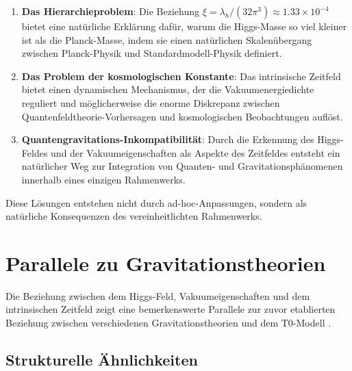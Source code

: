 \documentclass[12pt,a4paper]{article}
\begin{document}
	\begin{enumerate}
		\item \textbf{Das Hierarchieproblem}: Die Beziehung $\xi = \lambda_h/(32\pi^3) \approx 1.33 \times 10^{-4}$ bietet eine natürliche Erklärung dafür, warum die Higgs-Masse so viel kleiner ist als die Planck-Masse, indem sie einen natürlichen Skalenübergang zwischen Planck-Physik und Standardmodell-Physik definiert.
		
		\item \textbf{Das Problem der kosmologischen Konstante}: Das intrinsische Zeitfeld bietet einen dynamischen Mechanismus, der die Vakuumenergiedichte reguliert und möglicherweise die enorme Diskrepanz zwischen Quantenfeldtheorie-Vorhersagen und kosmologischen Beobachtungen auflöst.
		
		\item \textbf{Quantengravitations-Inkompatibilität}: Durch die Erkennung des Higgs-Feldes und der Vakuumeigenschaften als Aspekte des Zeitfeldes entsteht ein natürlicher Weg zur Integration von Quanten- und Gravitationsphänomenen innerhalb eines einzigen Rahmenwerks.
	\end{enumerate}
	
	Diese Lösungen entstehen nicht durch ad-hoc-Anpassungen, sondern als natürliche Konsequenzen des vereinheitlichten Rahmenwerks.
	
	\section{Parallele zu Gravitationstheorien}
	\label{sec:parallel_gravitation}
	
	Die Beziehung zwischen dem Higgs-Feld, Vakuumeigenschaften und dem intrinsischen Zeitfeld zeigt eine bemerkenswerte Parallele zur zuvor etablierten Beziehung zwischen verschiedenen Gravitationstheorien und dem T0-Modell \cite{pascher_completetheory_2025}.
	
	\subsection{Strukturelle Ähnlichkeiten}
	\label{subsec:structural_similarities}
	
\end{document}
